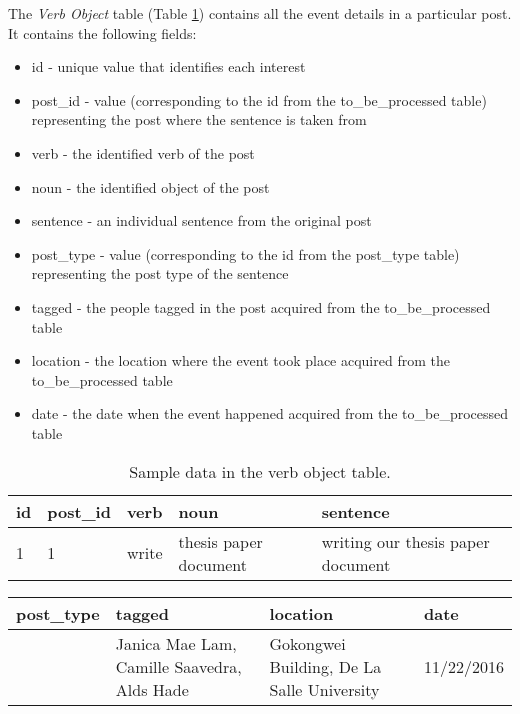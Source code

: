 The \textit{Verb Object} table (Table \ref{tab:sampleVO}) contains all the event details in a particular post. It contains the following fields:
\begin{itemize}
	\item id - unique value that identifies each interest
	\item post\_id - value (corresponding to the id from the to\_be\_processed table) representing the post where the sentence is taken from 
	\item verb - the identified verb of the post
	\item noun - the identified object of the post
	\item sentence - an individual sentence from the original post
	\item post\_type - value (corresponding to the id from the post\_type table) representing the post type of the sentence
	\item tagged - the people tagged in the post acquired from the to\_be\_processed table
	\item location - the location where the event took place acquired from the to\_be\_processed table
	\item date - the date when the event happened acquired from the to\_be\_processed table
\end{itemize}
\clearpage
\begin{table}[ph!]   
	\centering
	\caption{Sample data in the verb object table.} \vspace{0.25em}
	\begin{tabular}{|p{1cm}|p{1in}|p{1.5cm}|p{1in}|p{1in}|} \hline
		\textbf{id} & \textbf{post\_id} & \textbf{verb} & \textbf{noun} & \textbf{sentence}\\ \hline
		1&1&write&thesis paper document&writing our thesis paper document \\ \hline
	\end{tabular}
	\label{tab:sampleVO}
\end{table}

\begin{table}[ph!]   
	\centering
	\begin{tabular}{|p{1in}|p{1in}|p{1in}|p{1in}|} \hline
		\textbf{post\_type} & \textbf{tagged}& \textbf{location} & \textbf{date}\\ \hline
		&Janica Mae Lam, Camille Saavedra, Alds Hade&Gokongwei Building, De La Salle University& 11/22/2016 \\ \hline
	\end{tabular}
\end{table}

